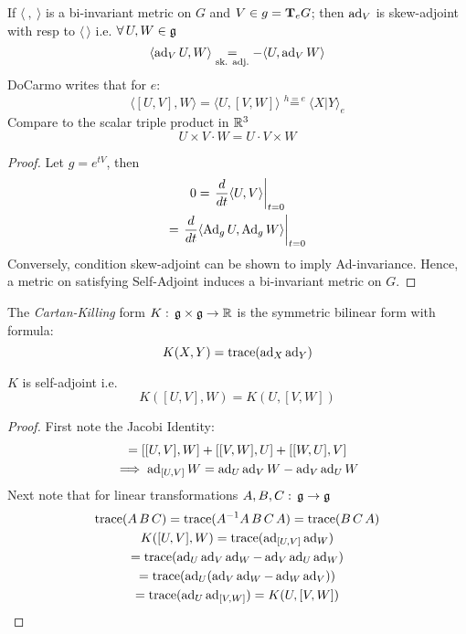 \begin{teorema}
    If $\langle \ , \  \rangle$ is a bi-invariant metric on $G$ and $V\in g = \text{\textbf{T}}_e G$; then $\operatorname{ad}_V$ is skew-adjoint with resp to $\langle \, \rangle$ i.e. $\forall\, U,W\in \mathfrak{g}$
    $$\langle \operatorname{ad}_V U, W\rangle \underset{\text{sk. adj.}}{=} - \langle U, \operatorname{ad}_V W \rangle$$
DoCarmo writes that for $e$:
$$\langle [U,V],W \rangle = \langle U, [V,W]\rangle \overset{h=e}{=} \langle X|Y \rangle_e$$
Compare to the scalar triple product in $\mathbb{R}^3$
$$U\times V\cdot W = U\cdot V \times W$$
\begin{proof}
    Let $g= e^{tV}$, then 
    \begin{gather*}
        0=\left. \frac{d}{dt}\langle U, V \rangle \right |_{t=0}\\
        = \left. \frac{d}{dt} \langle \operatorname{Ad}_gU, \operatorname{Ad}_g W \rangle \right|_{t=0}\\
    \end{gather*}
    Conversely, condition skew-adjoint can be shown to imply Ad-invariance. Hence, a metric on satisfying Self-Adjoint induces a bi-invariant metric on $G$.
\end{proof}
\end{teorema}

\begin{ddef}
    The \emph{Cartan-Killing} form $K:\, \mathfrak{g}\times \mathfrak{g} \to \mathbb{R}$ is the symmetric bilinear form with formula:
    $$K(X,Y) = \operatorname{trace}(\operatorname{ad}_X \operatorname{ad}_Y)$$
    \end{ddef}
    \begin{teorema}
        $K$ is self-adjoint i.e. 
        $$K([U,V],W)=K(U,[V,W])$$
        \begin{proof}
            First note the Jacobi Identity:
            \begin{gather*}
                = [[U,V],W] + [[V,W],U] + [[W,U],V]\\
                \implies \operatorname{ad}_{[U,V]}W = \operatorname{ad}_U \operatorname{ad}_V W - \operatorname{ad}_V\operatorname{ad}_U W
            \end{gather*}
Next note that for linear transformations $A,B,C:\, \mathfrak{g} \to \mathfrak{g}$
\begin{gather*}
    \operatorname{trace}(A\, B\, C) = \operatorname{trace}(A^{-1}A\, B\, C\, A) = \operatorname{trace}(B\,C\,A)\\
    K([U,V],W) = \operatorname{trace}(\operatorname{ad}_{[U,V]} \operatorname{ad}_W)\\
        =\operatorname{trace}(\operatorname{ad}_U \operatorname{ad}_V \operatorname{ad}_W - \operatorname{ad}_V\operatorname{ad}_U\operatorname{ad}_W)\\
        =\operatorname{trace}(\operatorname{ad}_U(\operatorname{ad}_V \operatorname{ad}_W - \operatorname{ad}_W \operatorname{ad}_V))\\
        =\operatorname{trace}(\operatorname{ad}_U\operatorname{ad}_{[V,W]}) = K(U,[V,W])
    \end{gather*}
\end{proof}
\end{teorema}

